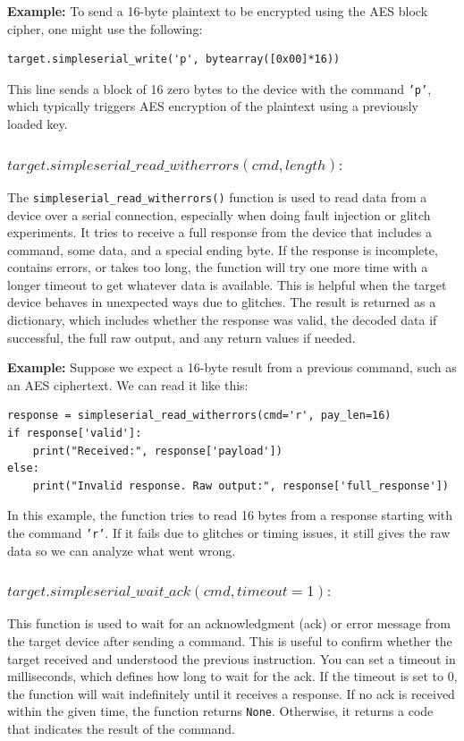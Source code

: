 \vspace{0.3cm}
\noindent
\textbf{Example:} To send a 16-byte plaintext to be encrypted using the AES block cipher, one might use the following:

\begin{verbatim}
target.simpleserial_write('p', bytearray([0x00]*16))
\end{verbatim}

This line sends a block of 16 zero bytes to the device with the command \texttt{'p'}, which typically triggers AES encryption of the plaintext using a previously loaded key.

\subsubsection{$target.simpleserial\_read\_witherrors(cmd, length) :$}
The \texttt{simpleserial\_read\_witherrors()} function is used to read data from a device over a serial connection, especially when doing fault injection or glitch experiments. It tries to receive a full response from the device that includes a command, some data, and a special ending byte. If the response is incomplete, contains errors, or takes too long, the function will try one more time with a longer timeout to get whatever data is available. This is helpful when the target device behaves in unexpected ways due to glitches. The result is returned as a dictionary, which includes whether the response was valid, the decoded data if successful, the full raw output, and any return values if needed.

\vspace{0.3cm}
\noindent
\textbf{Example:} Suppose we expect a 16-byte result from a previous command, such as an AES ciphertext. We can read it like this:

\begin{verbatim}
response = simpleserial_read_witherrors(cmd='r', pay_len=16)
if response['valid']:
    print("Received:", response['payload'])
else:
    print("Invalid response. Raw output:", response['full_response'])
\end{verbatim}

In this example, the function tries to read 16 bytes from a response starting with the command \texttt{'r'}. If it fails due to glitches or timing issues, it still gives the raw data so we can analyze what went wrong.

\subsubsection{$target.simpleserial\_wait\_ack(cmd, timeout=1) :$}
This function is used to wait for an acknowledgment (ack) or error message from the target device after sending a command. This is useful to confirm whether the target received and understood the previous instruction. You can set a timeout in milliseconds, which defines how long to wait for the ack. If the timeout is set to 0, the function will wait indefinitely until it receives a response. If no ack is received within the given time, the function returns \texttt{None}. Otherwise, it returns a code that indicates the result of the command.

